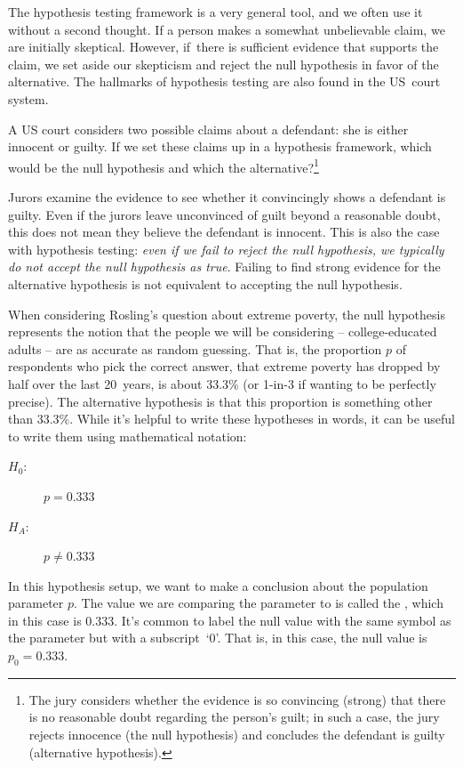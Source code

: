 The hypothesis testing framework is a very general tool, and we often use it without a second thought. If a person makes a somewhat unbelievable claim, we are initially skeptical. However, if~there is sufficient evidence that supports the claim, we set aside our skepticism and reject the null hypothesis in favor of the alternative. The hallmarks of hypothesis testing are also found in the US~court system. 

\begin{exercise} \label{hypTestCourtExample}
A US court considers two possible claims about a defendant: she is either innocent or guilty. If we set these claims up in a hypothesis framework, which would be the null hypothesis and which the alternative?\footnote{The jury considers whether the evidence is so convincing (strong) that there is no reasonable doubt regarding the person's guilt; in such a case, the jury rejects innocence (the null hypothesis) and concludes the defendant is guilty (alternative hypothesis).}
\end{exercise}

Jurors examine the evidence to see whether it convincingly
shows a defendant is guilty.
Even if the jurors leave unconvinced of guilt beyond
a reasonable doubt, this does not mean they believe the
defendant is innocent.
This is also the case with hypothesis testing:
\emph{even if we fail to reject the null hypothesis,
we typically do not accept the null hypothesis as true}.
Failing to find strong evidence for the alternative
hypothesis is not equivalent to accepting
the null hypothesis.

When considering Rosling's question about extreme poverty,
the null hypothesis represents the notion that the people
we will be considering -- college-educated adults --
are as accurate as random guessing.
That is, the proportion
$p$ of respondents who pick the correct
answer, that extreme poverty has dropped by half over the
last 20~years, is about 33.3\%
(or 1-in-3 if wanting to be perfectly precise).
The alternative hypothesis is that this proportion is something
other than 33.3\%. While it's helpful to write these hypotheses
in words, it can be useful to write them using mathematical
notation:
\begin{description}
\item[$H_0$:] $p = 0.333$
\item[$H_A$:] $p \neq 0.333$
\end{description}
In this hypothesis setup, we want to make a conclusion about
the population parameter $p$. The value we are comparing the
parameter to is called the , which in this
case is 0.333. It's common to label the null value with the
same symbol as the parameter but with a subscript~`0'.
That is, in this case, the null value is $p_0 = 0.333$.

